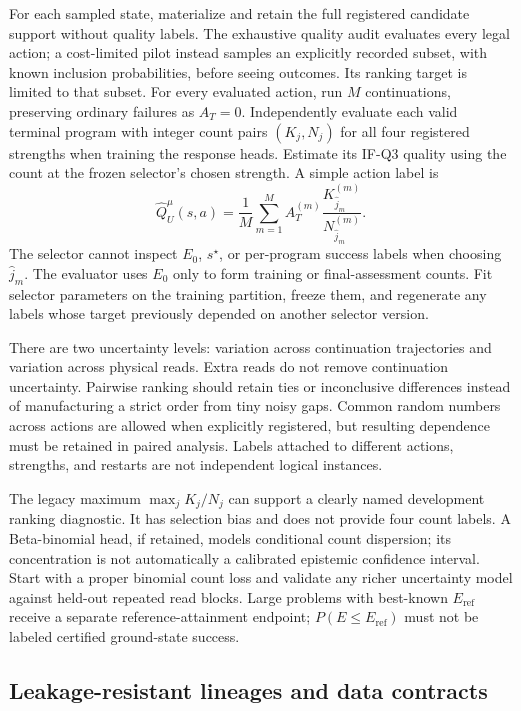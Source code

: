 \documentclass[11pt,a4paper]{article}
\theoremstyle{definition}\newtheorem{definition}[proposition]{Definition}
\begin{document}
For each sampled state, materialize and retain the full registered candidate support without quality labels. The exhaustive quality audit evaluates every legal action; a cost-limited pilot instead samples an explicitly recorded subset, with known inclusion probabilities, before seeing outcomes. Its ranking target is limited to that subset. For every evaluated action, run $M$ continuations, preserving ordinary failures as $A_T=0$. Independently evaluate each valid terminal program with integer count pairs $(K_j,N_j)$ for all four registered strengths when training the response heads. Estimate its IF-Q3 quality using the count at the frozen selector's chosen strength. A simple action label is
\[
 \widehat Q_U^\mu(s,a)=\frac1M\sum_{m=1}^{M}
      A_T^{(m)}\frac{K^{(m)}_{\widehat j_m}}{N^{(m)}_{\widehat j_m}}.
\]
The selector cannot inspect $E_0$, $s^\star$, or per-program success labels when choosing $\widehat j_m$. The evaluator uses $E_0$ only to form training or final-assessment counts. Fit selector parameters on the training partition, freeze them, and regenerate any labels whose target previously depended on another selector version.

There are two uncertainty levels: variation across continuation trajectories and variation across physical reads. Extra reads do not remove continuation uncertainty. Pairwise ranking should retain ties or inconclusive differences instead of manufacturing a strict order from tiny noisy gaps. Common random numbers across actions are allowed when explicitly registered, but resulting dependence must be retained in paired analysis. Labels attached to different actions, strengths, and restarts are not independent logical instances.

The legacy maximum $\max_j K_j/N_j$ can support a clearly named development ranking diagnostic. It has selection bias and does not provide four count labels. A Beta-binomial head, if retained, models conditional count dispersion; its concentration is not automatically a calibrated epistemic confidence interval. Start with a proper binomial count loss and validate any richer uncertainty model against held-out repeated read blocks. Large problems with best-known $E_{\mathrm{ref}}$ receive a separate reference-attainment endpoint; $P(E\le E_{\mathrm{ref}})$ must not be labeled certified ground-state success.

\subsection{Leakage-resistant lineages and data contracts}
\label{data:splits}
\end{document}
